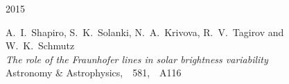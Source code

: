 \begin{cventries}
  \cventry
    {}     %
    {}     %
    {}     %
    {2015} %
    {
      \begin{cvitems} %
        \item {A.~I.~Shapiro, S.~K.~Solanki, N.~A.~Krivova, R.~V.~Tagirov and W.~K.~Schmutz\\
               \textit{The role of the Fraunhofer lines in solar brightness variability}\\
               Astronomy \& Astrophysics,\ \ 581,\ \ A116}
      \end{cvitems}
    }

\end{cventries}

